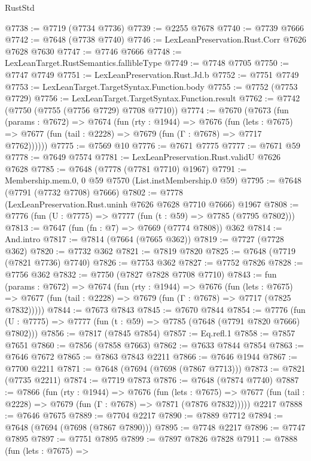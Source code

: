 \begin{lexlean}{RustStd}
\begin{coremodule}
{\begin{coremodule}
{{{{{{{{{{{{{{{{{{{{{{{{{{{{{{{{{{{{{{{{{{{{{{{{{{{{{@7738 := @7719 (@7734 @7736)
@7739 := @2255 @7678
@7740 := @7739 @7666
@7742 := @7648 (@7738 @7740)
@7746 := LexLeanPreservation.Rust.Corr @7626 @7628 @7630
@7747 := @7746 @7666
@7748 := LexLeanTarget.RustSemantics.fallibleType
@7749 := @7748 @7705
@7750 := @7747 @7749
@7751 := LexLeanPreservation.Rust.Jd.b
@7752 := @7751 @7749
@7753 := LexLeanTarget.TargetSyntax.Function.body
@7755 := @7752 (@7753 @7729)
@7756 := LexLeanTarget.TargetSyntax.Function.result
@7762 := @7742 (@7750 (@7755 (@7756 @7729) @7708 @7710))
@7774 := @7670
    (@7673
      (fun (params : @7672) =>
      @7674
        (fun (rty : @1944) =>
        @7676
          (fun (lets : @7675) =>
          @7677 (fun (tail : @2228) => @7679 (fun (Γ : @7678) => @7717 @7762))))))
@7775 := @7569 @10
@7776 := @7671 @7775
@7777 := @7671 @59
@7778 := @7649 @7574
@7781 := LexLeanPreservation.Rust.validU @7626 @7628
@7785 := @7648 (@7778 (@7781 @7710) @1967)
@7791 := Membership.mem.{0, 0} @59 @7570 (List.instMembership.{0} @59)
@7795 := @7648 (@7791 (@7732 @7708) @7666)
@7802 := @7778 (LexLeanPreservation.Rust.uninh @7626 @7628 @7710 @7666) @1967
@7808 := @7776 (fun (U : @7775) => @7777 (fun (t : @59) => @7785 (@7795 @7802)))
@7813 := @7647 (fun (fn : @7) => @7669 (@7774 @7808)) @362
@7814 := And.intro
@7817 := @7814 (@7664 (@7665 @362))
@7819 := @7727 (@7728 @362)
@7820 := @7732 @362
@7821 := @7819 @7820
@7825 := @7648 (@7719 (@7821 @7736) @7740)
@7826 := @7753 @362
@7827 := @7752 @7826
@7828 := @7756 @362
@7832 := @7750 (@7827 @7828 @7708 @7710)
@7843 := fun (params : @7672) =>
  @7674
    (fun (rty : @1944) =>
    @7676
      (fun (lets : @7675) =>
      @7677 (fun (tail : @2228) => @7679 (fun (Γ : @7678) => @7717 (@7825 @7832)))))
@7844 := @7673 @7843
@7845 := @7670 @7844
@7854 := @7776 (fun (U : @7775) => @7777 (fun (t : @59) => @7785 (@7648 (@7791 @7820 @7666) @7802)))
@7856 := @7817 (@7845 @7854)
@7857 := Eq.refl.{1}
@7858 := @7857 @7651
@7860 := @7856 (@7858 @7663)
@7862 := @7633 @7844 @7854
@7863 := @7646 @7672
@7865 := @7863 @7843 @2211
@7866 := @7646 @1944
@7867 := @7700 @2211
@7871 := @7648 (@7694 (@7698 (@7867 @7713)))
@7873 := @7821 (@7735 @2211)
@7874 := @7719 @7873
@7876 := @7648 (@7874 @7740)
@7887 := @7866
    (fun (rty : @1944) =>
    @7676
      (fun (lets : @7675) =>
      @7677 (fun (tail : @2228) => @7679 (fun (Γ : @7678) => @7871 (@7876 @7832)))))
    @2217
@7888 := @7646 @7675
@7889 := @7704 @2217
@7890 := @7889 @7712
@7894 := @7648 (@7694 (@7698 (@7867 @7890)))
@7895 := @7748 @2217
@7896 := @7747 @7895
@7897 := @7751 @7895
@7899 := @7897 @7826 @7828
@7911 := @7888
    (fun (lets : @7675) =>
}}}}}}}}}}}}}}}}}}}}}}}}}}}}}}}}}}}}}}}}}}}}}}}}}}}}}
\end{coremodule}}
\end{coremodule}
\end{lexlean}
